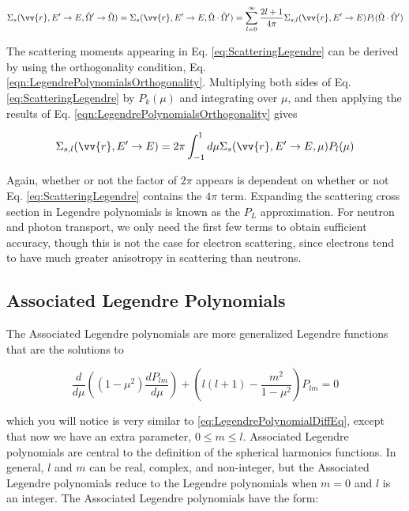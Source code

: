 \documentclass[10pt]{article}
\begin{document}
\begin{flushleft}
\begin{equation}
\label{eq:ScatteringLegendre2}
\Sigma_s(\vv{r}, E'\rightarrow E, \hat{\Omega}'\rightarrow\hat{\Omega}) = \Sigma_s(\vv{r}, E'\rightarrow E, \hat{\Omega}\cdot\hat{\Omega}') = \sum_{l=0}^{\infty} \frac{2l+1}{4\pi} \Sigma_{s,l}(\vv{r}, E'\rightarrow E)P_l(\hat{\Omega}\cdot\hat{\Omega}')
\end{equation}

The scattering moments appearing in Eq. \ref{eq:ScatteringLegendre} can be derived by using the orthogonality condition, Eq. \ref{eqn:LegendrePolynomialsOrthogonality}. Multiplying both sides of Eq. \ref{eq:ScatteringLegendre} by \(P_k(\mu)\) and integrating over \(\mu\), and then applying the results of Eq. \ref{eqn:LegendrePolynomialsOrthogonality} gives

\begin{equation}
\label{eq:ScatteringMomentsLegendre}
\Sigma_{s,l}(\vv{r}, E'\rightarrow E) = 2\pi\int_{-1}^{1} d\mu \Sigma_s(\vv{r}, E'\rightarrow E, \mu) P_l(\mu)
\end{equation}

Again, whether or not the factor of \(2\pi\) appears is dependent on whether or not Eq. \ref{eq:ScatteringLegendre} contains the \(4\pi\) term. Expanding the scattering cross section in Legendre polynomials is known as the \(P_L\) approximation. For neutron and photon transport, we only need the first few terms to obtain sufficient accuracy, though this is not the case for electron scattering, since electrons tend to have much greater anisotropy in scattering than neutrons.

\subsection{Associated Legendre Polynomials}

The Associated Legendre polynomials are more generalized Legendre functions that are the solutions to

\begin{equation}
\label{eq:AssociatedLegendrePolynomialDiffEq}
\frac{d}{d\mu} \left((1-\mu^2) \frac{dP_{lm}}{d\mu}\right) + \left(l(l+1) -\frac{m^2}{1-\mu^2}\right)P_{lm} = 0
\end{equation}

which you will notice is very similar to \ref{eq:LegendrePolynomialDiffEq}, except that now we have an extra parameter, \(0 \leq m \leq l\). Associated Legendre polynomials are central to the definition of the spherical harmonics functions. In general, \(l\) and \(m\) can be real, complex, and non-integer, but the Associated Legendre polynomials reduce to the Legendre polynomials when \(m=0\) and \(l\) is an integer. The Associated Legendre polynomials have the form:


\end{flushleft}
\end{document}
